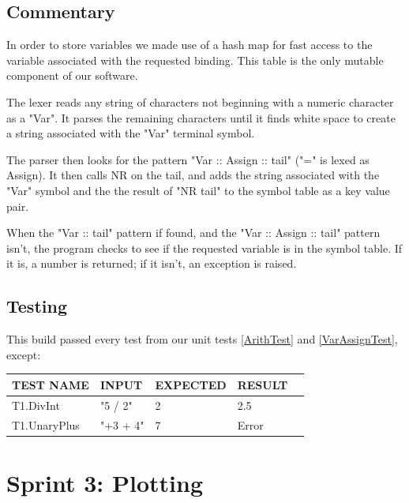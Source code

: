 \documentclass[a4paper, oneside, 11pt]{report}
\begin{document}
    \subsection{Commentary}
    In order to store variables we made use of a hash map for fast access to the variable associated with the requested binding. This table is the only mutable component of our software.

    The lexer reads any string of characters not beginning with a numeric character as a "Var". It parses the remaining characters until it finds white space to create a string associated with the "Var" terminal symbol.

    The parser then looks for the pattern "Var :: Assign :: tail" ("=" is lexed as Assign). It then calls NR on the tail, and adds the string associated with the "Var" symbol and the the result of "NR tail" to the symbol table as a key value pair.

    When the "Var :: tail" pattern if found, and the "Var :: Assign :: tail" pattern isn't, the program checks to see if the requested variable is in the symbol table. If it is, a number is returned; if it isn't, an exception is raised.

    \subsection{Testing}
    This build passed every test from our unit tests \ref{ArithTest} and \ref{VarAssignTest}, except:

    \begin{center}
        \begin{tabular}{|p{1.5in}|p{1.5in}|p{1in}|p{1.6in}|p{2.4in}|}
            \hline
            TEST NAME & INPUT & EXPECTED & RESULT \\
            \hline
            T1.DivInt & "5 / 2" & 2 & 2.5 \\
            \hline
            T1.UnaryPlus & "+3 + 4" & 7 & Error \\
            \hline
        \end{tabular}
    \end{center}


    \clearpage
    \section{Sprint 3: Plotting}
\end{document}
